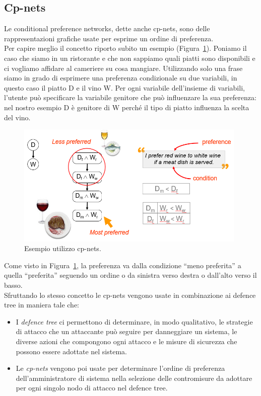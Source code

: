 \subsection{Cp-nets}
Le conditional preference networks, dette anche cp-nets, sono delle rappresentazioni grafiche usate per esprime un ordine di preferenza.\\ 

Per capire meglio il concetto riporto subito un esempio (Figura~\ref{fig:cp-nets_example}). Poniamo il caso che siamo in un ristorante e che non sappiamo quali piatti sono disponibili e ci vogliamo affidare al cameriere su cosa mangiare. Utilizzando solo una frase siamo in grado di esprimere una preferenza condizionale su due variabili, in questo caso il piatto D e il vino W. Per ogni variabile dell'insieme di variabili, l'utente può specificare la variabile genitore che può influenzare la sua preferenza: nel nostro esempio D è genitore di W perché il tipo di piatto influenza la scelta del vino.

\begin{figure}[H]
	\centering
	\includegraphics[width=11cm, keepaspectratio]{capitoli/risks/imgs/cp-nets_example.png}
	\caption{Esempio utilizzo cp-nets.}
	\label{fig:cp-nets_example}
\end{figure}

Come visto in Figura~\ref{fig:cp-nets_example}, la preferenza va dalla condizione ``meno preferita'' a quella ``preferita'' seguendo un ordine o da sinistra verso destra o dall'alto verso il basso.\\

Sfruttando lo stesso concetto le cp-nets vengono usate in combinazione ai defence tree in maniera tale che:
\begin{itemize}
	\item I \emph{defence tree} ci permettono di determinare, in modo qualitativo, le strategie di attacco che un attaccante può seguire per danneggiare 
	un sistema, le diverse azioni che compongono ogni attacco e le misure di sicurezza che possono essere adottate nel sistema.
	\item Le \emph{cp-nets} vengono poi usate per determinare l'ordine di preferenza dell'amministratore di sistema nella selezione delle contromisure da adottare per ogni singolo nodo di attacco nel defence tree.
\end{itemize}

